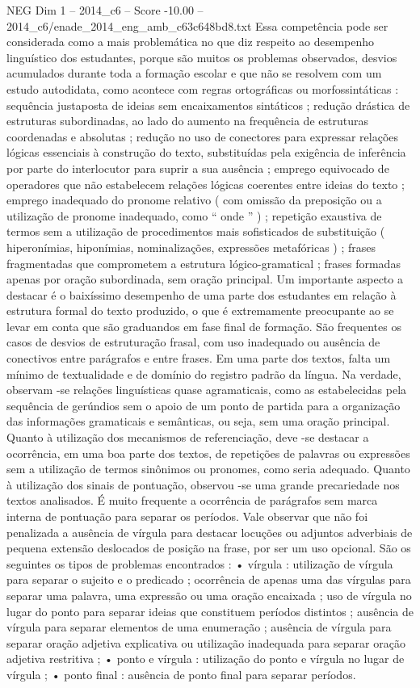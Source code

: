 \begin{textsample}{NEG Dim 1 – 2014\_c6 – Score -10.00 – 2014\_c6/enade\_2014\_eng\_amb\_c63c648bd8.txt}
Essa competência pode ser considerada como a mais problemática no que diz respeito ao desempenho linguístico dos estudantes, porque são muitos os problemas observados, desvios acumulados durante toda a formação escolar e que não se resolvem com um estudo autodidata, como acontece com regras ortográficas ou morfossintáticas : sequência justaposta de ideias sem encaixamentos sintáticos ; redução drástica de estruturas subordinadas, ao lado do aumento na frequência de estruturas coordenadas e absolutas ; redução no uso de conectores para expressar relações lógicas essenciais à construção do texto, substituídas pela exigência de inferência por parte do interlocutor para suprir a sua ausência ; emprego equivocado de operadores que não estabelecem relações lógicas coerentes entre ideias do texto ; emprego inadequado do pronome relativo ( com omissão da preposição ou a utilização de pronome inadequado, como “ onde ” ) ; repetição exaustiva de termos sem a utilização de procedimentos mais sofisticados de substituição ( hiperonímias, hiponímias, nominalizações, expressões metafóricas ) ; frases fragmentadas que comprometem a estrutura lógico-gramatical ; frases formadas apenas por oração subordinada, sem oração principal.
Um importante aspecto a destacar é o baixíssimo desempenho de uma parte dos estudantes em relação à estrutura formal do texto produzido, o que é extremamente preocupante ao se levar em conta que são graduandos em fase final de formação.
São frequentes os casos de desvios de estruturação frasal, com uso inadequado ou ausência de conectivos entre parágrafos e entre frases.
Em uma parte dos textos, falta um mínimo de textualidade e de domínio do registro padrão da língua.
Na verdade, observam -se relações linguísticas quase agramaticais, como as estabelecidas pela sequência de gerúndios sem o apoio de um ponto de partida para a organização das informações gramaticais e semânticas, ou seja, sem uma oração principal.
Quanto à utilização dos mecanismos de referenciação, deve -se destacar a ocorrência, em uma boa parte dos textos, de repetições de palavras ou expressões sem a utilização de termos sinônimos ou pronomes, como seria adequado.
Quanto à utilização dos sinais de pontuação, observou -se uma grande precariedade nos textos analisados.
É muito frequente a ocorrência de parágrafos sem marca interna de pontuação para separar os períodos.
Vale observar que não foi penalizada a ausência de vírgula para destacar locuções ou adjuntos adverbiais de pequena extensão deslocados de posição na frase, por ser um uso opcional.
São os seguintes os tipos de problemas encontrados : • vírgula : utilização de vírgula para separar o sujeito e o predicado ; ocorrência de apenas uma das vírgulas para separar uma palavra, uma expressão ou uma oração encaixada ; uso de vírgula no lugar do ponto para separar ideias que constituem períodos distintos ; ausência de vírgula para separar elementos de uma enumeração ; ausência de vírgula para separar oração adjetiva explicativa ou utilização inadequada para separar oração adjetiva restritiva ; • ponto e vírgula : utilização do ponto e vírgula no lugar de vírgula ; • ponto final : ausência de ponto final para separar períodos.

\end{textsample}

